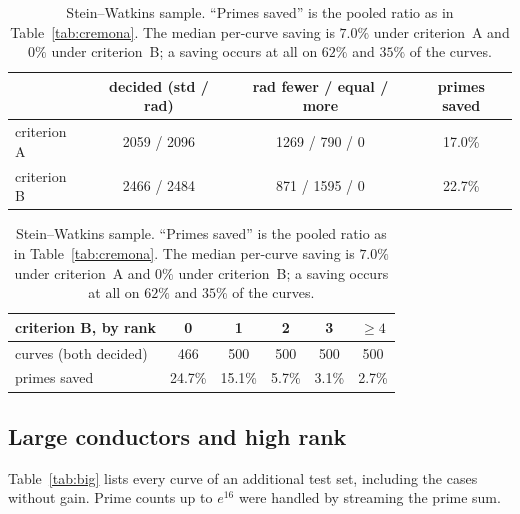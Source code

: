 \documentclass[11pt]{amsart}
\theoremstyle{remark}
\theoremstyle{definition}
\begin{document}
\begin{table}[h]
\centering\small
\begin{tabular}{lccc}
\toprule
 & decided (std / rad) & rad fewer / equal / more & primes saved\\
\midrule
criterion A & 2059 / 2096 & 1269 / \phantom{1}790 / 0 & 17.0\%\\
criterion B & 2466 / 2484 & \phantom{1}871 / 1595 / 0 & 22.7\%\\
\bottomrule
\end{tabular}

\smallskip
\begin{tabular}{lccccc}
\toprule
criterion B, by rank & 0 & 1 & 2 & 3 & $\ge4$\\
\midrule
curves (both decided) & 466 & 500 & 500 & 500 & 500\\
primes saved & 24.7\% & 15.1\% & 5.7\% & 3.1\% & 2.7\%\\
\bottomrule
\end{tabular}
\caption{Stein--Watkins sample. ``Primes saved'' is the pooled ratio as in
Table~\ref{tab:cremona}. The median per-curve saving is $7.0\%$ under criterion~A and $0\%$ under
criterion~B; a saving occurs at all on $62\%$ and $35\%$ of the curves.}
\label{tab:sw}
\end{table}

\subsection{Large conductors and high rank}
Table~\ref{tab:big} lists every curve of an additional test set, including the cases without gain. Prime counts up to $e^{16}$ were handled by streaming the prime sum.
\end{document}

